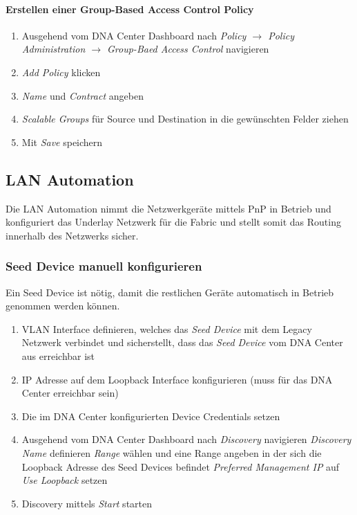 \paragraph{Erstellen einer Group-Based Access Control Policy}
\begin{enumerate}
	\item Ausgehend vom DNA Center Dashboard nach \textit{Policy $\rightarrow$ Policy Administration $\rightarrow$ Group-Baed Access Control} navigieren
	\item \textit{Add Policy} klicken
	\item \textit{Name} und \textit{Contract} angeben
	\item \textit{Scalable Groups} für Source und Destination in die gewünschten Felder ziehen
	\item Mit \textit{Save} speichern
\end{enumerate}

\subsection{LAN Automation}
Die LAN Automation nimmt die Netzwerkgeräte mittels PnP in Betrieb und konfiguriert das Underlay Netzwerk für die Fabric und stellt somit das Routing innerhalb des Netzwerks sicher.

\subsubsection{Seed Device manuell konfigurieren}
Ein Seed Device ist nötig, damit die restlichen Geräte automatisch in Betrieb genommen werden können.
\begin{enumerate}
	\item VLAN Interface definieren, welches das \textit{Seed Device} mit dem Legacy Netzwerk verbindet und sicherstellt, dass das \textit{Seed Device} vom DNA Center aus erreichbar ist
	\item IP Adresse auf dem Loopback Interface konfigurieren (muss für das DNA Center erreichbar sein)
	\item Die im DNA Center konfigurierten Device Credentials setzen
	\item Ausgehend vom DNA Center Dashboard nach \textit{Discovery} navigieren
	\subitem \textit{Discovery Name} definieren
	\subitem \textit{Range} wählen und eine Range angeben in der sich die Loopback Adresse des Seed Devices befindet
	\subitem \textit{Preferred Management IP} auf \textit{Use Loopback} setzen
	\item Discovery mittels \textit{Start} starten
\end{enumerate}

